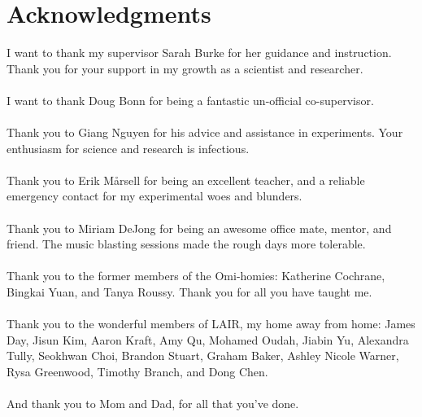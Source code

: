
\chapter{Acknowledgments}

I want to thank my supervisor Sarah Burke for her guidance and instruction. Thank you for your support in my growth as a scientist and researcher.\\
\\
I want to thank Doug Bonn for being a fantastic un-official co-supervisor.\\
\\
Thank you to Giang Nguyen for his advice and assistance in experiments. Your enthusiasm for science and research is infectious. \\
\\
Thank you to Erik M\aa rsell for being an excellent teacher, and a reliable emergency contact for my experimental woes and blunders.\\
\\
Thank you to Miriam DeJong for being an awesome office mate, mentor, and friend. The music blasting sessions made the rough days more tolerable.\\
\\
Thank you to the former members of the Omi-homies: Katherine Cochrane, Bingkai Yuan, and Tanya Roussy. Thank you for all you have taught me.\\
\\
Thank you to the wonderful members of LAIR, my home away from home: James Day, Jisun Kim, Aaron Kraft, Amy Qu, Mohamed Oudah, Jiabin Yu, Alexandra Tully, Seokhwan Choi, Brandon Stuart, Graham Baker, Ashley Nicole Warner, Rysa Greenwood, Timothy Branch, and Dong Chen.\\
\\
And thank you to Mom and Dad, for all that you've done.








